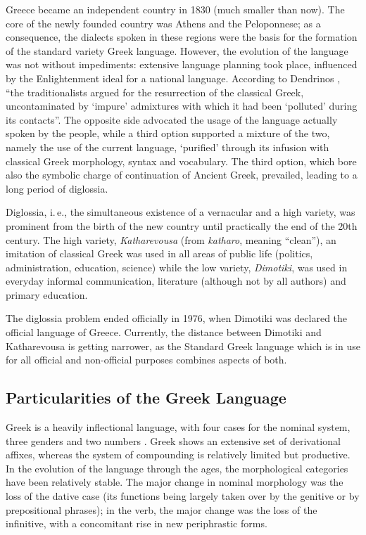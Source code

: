 \begin{multicols}{2}

Greece became an independent country in 1830 (much smaller than now). The core of the newly founded country was Athens and the Peloponnese; as a consequence, the dialects spoken in these regions were the basis for the formation of the standard variety Greek language. However, the evolution of the language was not without impediments: extensive language planning took place, influenced by the Enlightenment ideal for a national language. According to Dendrinos \cite{Dend1}, “the traditionalists argued for the resurrection of the classical Greek, uncontaminated by ‘impure’ admixtures with which it had been ‘polluted’ during its contacts”. The opposite side advocated the usage of the language actually spoken by the people, while a third option supported a mixture of the two, namely the use of the current language, ‘purified’ through its infusion with classical Greek morphology, syntax  and vocabulary. The third option, which bore also the symbolic charge of continuation of Ancient Greek, prevailed, leading to a long period of diglossia.

Diglossia, i.\,e., the simultaneous existence of a vernacular and a high variety, was prominent from the birth of the new country until practically the end of the 20th century. The high variety, \textit{Katharevousa} (from \textit{katharo}, meaning “clean”), an imitation of classical Greek was used in all areas of public life (politics, administration, education, science) while the low variety, \textit{Dimotiki}, was used in everyday informal communication, literature (although not by all authors) and primary education.

The diglossia problem ended officially in 1976, when Dimotiki was declared the official language of Greece. Currently, the distance between Dimotiki and Katharevousa is getting narrower, as the Standard Greek language which is in use for all official and non-official purposes combines aspects of both.

\subsection{Particularities of the Greek Language}

Greek is a heavily inflectional language, with four cases for the nominal system, three genders and two numbers \cite{Mack1}. Greek shows an extensive set of derivational affixes, whereas the system of compounding is relatively limited but productive. In the evolution of the language through the ages, the morphological categories have been relatively stable. The major change in nominal morphology was the loss of the dative case (its functions being largely taken over by the genitive or by prepositional phrases); in the verb, the major change was the loss of the infinitive, with a concomitant rise in new periphrastic forms.


\end{multicols}
